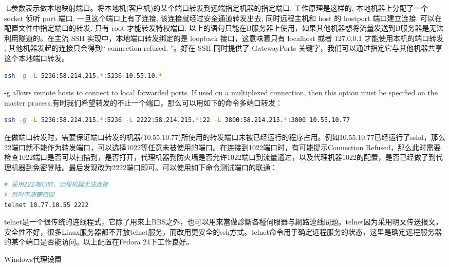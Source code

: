 \documentclass[12pt]{book}
\makeatletter
\numberwithin{dummy}{section}
\theoremstyle{ocrenumbox}
\theoremstyle{blacknumex}
\theoremstyle{blacknumbox}
\theoremstyle{ocrenum}
\renewcommand\paragraph{\@startsection{paragraph}{4}{\z@}
	{-2ex \@plus-.2ex \@minus .2ex}
	{.1ex}
	{\normalfont\small\sffamily\bfseries}}
\makeatother
\begin{document}
-L参数表示做本地映射端口。将本地机(客户机)的某个端口转发到远端指定机器的指定端口. 工作原理是这样的, 本地机器上分配了一个 socket 侦听 port 端口, 一旦这个端口上有了连接, 该连接就经过安全通道转发出去, 同时远程主机和 host 的 hostport 端口建立连接. 可以在配置文件中指定端口的转发. 只有 root 才能转发特权端口. 以上的语句只能在B服务器上使用，如果其他机器想将流量发送到B服务器是无法利用隧道的。在主流 SSH 实现中，本地端口转发绑定的是 loopback 接口，这意味着只有 localhost 或者 127.0.0.1 才能使用本机的端口转发 , 其他机器发起的连接只会得到“ connection refused. ”。好在 SSH 同时提供了 GatewayPorts 关键字，我们可以通过指定它与其他机器共享这个本地端口转发。

\begin{lstlisting}[language=Bash]
ssh -g -L 5236:58.214.215.*:5236 10.55.10.*
\end{lstlisting}

-g allows remote hosts to connect to local forwarded ports.  If used on a multiplexed connection, then this option must be specified on the master process.有时我们希望转发的不止一个端口，那么可以用如下的命令多端口转发：

\begin{lstlisting}[language=Bash]
ssh -g -L 5236:58.214.215.*:5236 -L 2222:58.214.215.*:22 -L 3800:58.214.215.*:3800 10.55.10.77
\end{lstlisting}

在做端口转发时，需要保证端口转发的机器(10.55.10.77)所使用的转发端口未被已经运行的程序占用。例如10.55.10.77已经运行了sshd，那么22端口就不能作为转发端口，可以选择1022等任意未被使用的端口。在连接到1022端口时，有可能提示Connection Refused，那么此时需要检查1022端口是否可以扫描到，是否打开，代理机器到防火墙是否允许1022端口到流量通过，以及代理机器1022的配置，是否已经做了到代理机器到免密登陆。最后发现改为2222端口即可。可以使用如下命令测试端口的联通：

\begin{lstlisting}[language=Bash]
# 采用222端口时，远程机器无法连接
# 暂时不清楚原因
telnet 10.77.10.55 2222
\end{lstlisting}

telnet是一个很传统的连线程式，它除了用來上BBS之外，也可以用來當做診斷各種伺服器与網路連线問題。telnet因为采用明文传送报文，安全性不好，很多Linux服务器都不开放telnet服务，而改用更安全的ssh方式。telnet命令用于确定远程服务的状态，这里是确定远程服务器的某个端口是否能访问。以上配置在Fedora 24下工作良好。

\paragraph{Windows代理设置}
\end{document}
